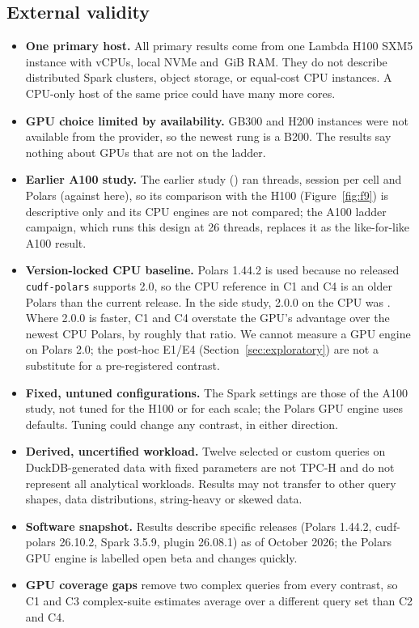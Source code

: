 \documentclass[11pt]{article}
\begin{document}
\subsection{External validity}
\begin{itemize}[leftmargin=*,itemsep=2pt]
  \item \textbf{One primary host.} All primary results come from one Lambda
    H100 SXM5 instance with  vCPUs, local NVMe and \,GiB RAM. They do not
    describe distributed Spark clusters, object storage, or equal-cost CPU
    instances. A CPU-only host of the same price could have many more cores.
  \item \textbf{GPU choice limited by availability.} GB300 and H200 instances
    were not available from the provider, so the newest rung is a B200. The
    results say nothing about GPUs that are not on the ladder.
  \item \textbf{Earlier A100 study.} The earlier study
    () ran 
    threads,  session per cell and
    Polars  (against
     here), so its comparison with
    the H100 (Figure~\ref{fig:f9}) is descriptive only and its CPU engines are
    not compared; the A100 ladder campaign, which runs this design at 26
    threads, replaces it as the like-for-like A100 result.
  \item \textbf{Version-locked CPU baseline.} Polars 1.44.2 is used because no
    released \texttt{cudf-polars} supports 2.0, so the CPU reference in C1 and
    C4 is an older Polars than the current release. In the side study, 2.0.0
    on the CPU was .
    Where 2.0.0 is faster, C1 and C4 overstate the GPU's advantage over the
    newest CPU Polars, by roughly that ratio. We cannot measure a GPU engine on
    Polars 2.0; the post-hoc E1/E4 (Section~\ref{sec:exploratory}) are not a
    substitute for a pre-registered contrast.
  \item \textbf{Fixed, untuned configurations.} The Spark settings are those
    of the A100 study, not tuned for the H100 or for each scale; the Polars GPU
    engine uses defaults. Tuning could change any contrast, in either
    direction.
  \item \textbf{Derived, uncertified workload.} Twelve selected or custom
    queries on DuckDB-generated data with fixed parameters are not TPC-H and
    do not represent all analytical workloads. Results may not transfer to
    other query shapes, data distributions, string-heavy or skewed data.
  \item \textbf{Software snapshot.} Results describe specific releases
    (Polars 1.44.2, cudf-polars 26.10.2, Spark 3.5.9, plugin 26.08.1) as of
    October 2026; the Polars GPU engine is labelled open beta and changes
    quickly.
  \item \textbf{GPU coverage gaps} remove two complex queries from every
    \polarsgpu{} contrast, so C1 and C3 complex-suite estimates average over a
    different query set than C2 and C4.
\end{itemize}
\end{document}

